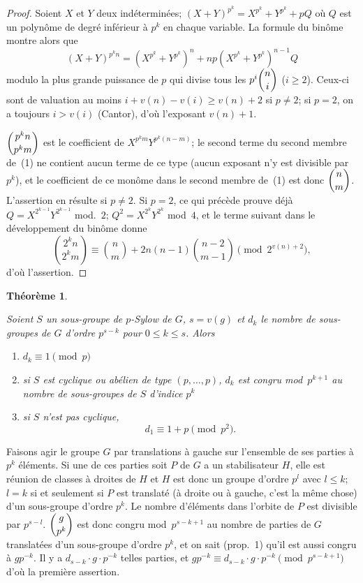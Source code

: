 \documentclass[12pt]{amsart}
\theoremstyle{plain}
\newtheorem*{theoreme}{Théorème}
\begin{document}
\begin{proof}
Soient $X$ et $Y$ deux indéterminées; $(X+Y)^{p^k} = X^{p^k} + Y^{p^k} + pQ$ où $Q$ est un polynôme de degré inférieur à $p^k$ en chaque variable. La formule du binôme montre alors que
\begin{equation}
(X+Y)^{p^k n} = (X^{p^k} + Y^{p^k})^n + np(X^{p^k} + Y^{p^k})^{n-1}Q
\end{equation}
modulo la plus grande puissance de $p$ qui divise tous les $p^i \dbinom{n}{i}$ ($i \geqslant 2$). Ceux-ci sont de valuation au moins $i + v(n) - v(i) \geqslant v(n) + 2$ si $p \neq 2$; si $p = 2$, on a toujours $i > v(i)$ (Cantor), d'où l'exposant $v(n) + 1$.

$\dbinom{p^k n}{p^k m}$ est le coefficient de $X^{p^k m}Y^{p^k(n-m)}$; le second terme du second membre de~(1) ne contient aucun terme de ce type (aucun exposant n'y est divisible par $p^k$), et le coefficient de ce monôme dans le second membre de~(1) est donc $\dbinom{n}{m}$. L'assertion en résulte si $p \neq 2$. Si $p = 2$, ce qui précède prouve déjà $Q = X^{2^{k-1}}Y^{2^{k-1}}$ mod.~$2$; $Q^2 = X^{2^k}Y^{2^k}$ mod~$4$, et le terme suivant dans le développement du binôme donne
\[
\binom{2^k n}{2^k m} \equiv \binom{n}{m} + 2n(n-1)\binom{n-2}{m-1} \pmod{2^{v(n)+2}},
\]
d'où l'assertion.
\end{proof}

\begin{theoreme}\ \par
Soient $S$ un sous-groupe de $p$-Sylow de $G$, $s = v(g)$ et $d_k$ le nombre de sous-groupes de $G$ d'ordre $p^{s-k}$ pour $0 \leqslant k \leqslant s$. Alors
\begin{enumerate}
\item[(i)] $d_k \equiv 1 \pmod p$
\item[(ii)] si $S$ est cyclique ou abélien de type $(p,\dots,p)$, $d_k$ est congru mod~$p^{k+1}$ au nombre de sous-groupes de $S$ d'indice $p^k$
\item[(iii)] si $S$ n'est pas cyclique,
\[
d_1 \equiv 1 + p \pmod{p^2}.
\]
\end{enumerate}
\end{theoreme}

Faisons agir le groupe $G$ par translations à gauche sur l'ensemble de ses parties à $p^k$ éléments. Si une de ces parties soit $P$ de $G$ a un stabilisateur $H$, elle est réunion de classes à droites de $H$ et $H$ est donc un groupe d'ordre $p^l$ avec $l \leqslant k$; $l = k$ si et seulement si $P$ est translaté (à droite ou à gauche, c'est la même chose) d'un sous-groupe d'ordre $p^k$. Le nombre d'éléments dans l'orbite de $P$ est divisible par $p^{s-l}$. $\dbinom{g}{p^k}$ est donc congru mod~$p^{s-k+1}$ au nombre de parties de $G$ translatées d'un sous-groupe d'ordre $p^k$, et on sait (prop.~1) qu'il est aussi congru à $gp^{-k}$. Il y a $d_{s-k} \cdot g \cdot p^{-k}$ telles parties, et $gp^{-k} \equiv d_{s-k} \cdot g \cdot p^{-k} \pmod{p^{s-k+1}}$ d'où la première assertion.
\end{document}
